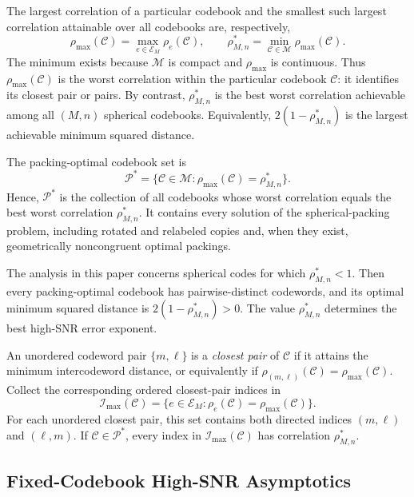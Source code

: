 \documentclass[12pt,draftclsnofoot,onecolumn]{IEEEtran}
\newcommand{\cC}{\mathcal{C}}
\newcommand{\cE}{\mathcal{E}}
\newcommand{\cI}{\mathcal{I}}
\newcommand{\cM}{\mathcal{M}}
\newcommand{\cP}{\mathcal{P}}
\theoremstyle{definition}
\begin{document}
The largest correlation of a particular codebook and the smallest such
largest correlation attainable over all codebooks are, respectively,
\begin{equation}
  \rho_{\max}(\cC)=\max_{e\in\cE_M}\rho_e(\cC),
  \qquad
  \rho^{\ast}_{M,n}=\min_{\cC\in\cM}\rho_{\max}(\cC).
  \label{eq:rho-max-rho-star}
\end{equation}
The minimum exists because \(\cM\) is compact and \(\rho_{\max}\) is
continuous.
Thus \(\rho_{\max}(\cC)\) is the worst correlation within the particular
codebook \(\cC\): it identifies its closest pair or pairs.  By contrast,
\(\rho^{\ast}_{M,n}\) is the best worst correlation achievable among all \((M,n)\)
spherical codebooks.  Equivalently,
\(2(1-\rho^{\ast}_{M,n})\) is the largest achievable minimum squared
distance.

The packing-optimal codebook set is
\begin{equation}
  \cP^{\ast}
  =\{\cC\in\cM:\rho_{\max}(\cC)=\rho^{\ast}_{M,n}\}.
  \label{eq:Pstar-def}
\end{equation}
Hence, \(\cP^{\ast}\) is the collection of all codebooks whose worst
correlation equals the best worst correlation \(\rho^{\ast}_{M,n}\).
It contains every solution of the spherical-packing problem, including
rotated and relabeled copies and, when they exist, geometrically
noncongruent optimal packings.

The analysis in this paper concerns spherical codes for which
\(\rho^{\ast}_{M,n}<1\).  Then every packing-optimal codebook has
pairwise-distinct codewords, and its optimal minimum squared distance is
\(2(1-\rho^{\ast}_{M,n})>0\).  The value
\(\rho^{\ast}_{M,n}\) determines the best high-SNR error exponent.


An unordered codeword pair \(\{m,\ell\}\) is a \emph{closest pair} of
\(\cC\) if it attains the minimum intercodeword distance, or equivalently
if \(\rho_{(m,\ell)}(\cC)=\rho_{\max}(\cC)\).  Collect the corresponding
ordered closest-pair indices in
\begin{equation}
  \cI_{\max}(\cC)
  =\{e\in\cE_M:\rho_e(\cC)=\rho_{\max}(\cC)\}.
  \label{eq:Imax-def}
\end{equation}
For each unordered closest pair, this set contains both directed indices
\((m,\ell)\) and \((\ell,m)\).  If
\(\cC\in\cP^{\ast}\), every index in \(\cI_{\max}(\cC)\) has
correlation \(\rho^{\ast}_{M,n}\).

\subsection{Fixed-Codebook High-SNR Asymptotics}
\label{subsec:fixed-codebook-asymptotics}
\end{document}
